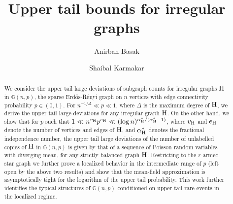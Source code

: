 \documentclass[a4paper,11pt,english,reqno]{amsart}
\numberwithin{equation}{section}
\newcommand{\uH}{\textup{H}}
\newcommand{\G}{\mathbb{G}}
\begin{document}
 
	\title{Upper tail bounds for irregular graphs}
	
	
	
	
	\author{Anirban Basak}
	\address{Anirban Basak, International Centre for Theoretical Sciences, Tata Institute of Fundamental Research, Bangalore, India}
	\author{Shaibal Karmakar}
	\address{Shaibal Karmakar, International Centre for Theoretical Sciences, Tata Institute of Fundamental Research, Bangalore, India}
	
	
	
	
	
	
	
	
	\maketitle
	\begin{abstract}
		We consider the upper tail large deviations of subgraph counts for irregular graphs $\uH$ in $\mathbb{G}(n,p)$, the sparse Erd\H{o}s-R\'enyi graph on $n$ vertices with edge connectivity probability $p \in (0,1)$. For $n^{-1/\Delta} \ll p \ll 1$, where $\Delta$ is the maximum degree of $\uH$, we derive the upper tail large deviations for any irregular graph $\uH$. On the other hand, we show that for $p$ such that $1 \ll n^{v_\uH} p^{e_\uH} \ll (\log n)^{\alpha^{*}_{\uH}/\left(\alpha^{*}_{\uH}-1\right)}$, where $v_\uH$ and $e_\uH$ denote the number of vertices and edges of $\uH$, and $\alpha^*_\uH$ denotes the fractional independence number, the upper tail large deviations of the number of unlabelled copies of $\uH$ in $\G(n,p)$ is given by that of a sequence of Poisson random variables with diverging mean, for any strictly balanced graph $\uH$. Restricting to the $r$-armed star graph we further prove a localized behavior in the intermediate range of $p$ (left open by the above two results) and show that the mean-field approximation is asymptotically tight for the logarithm of the upper tail probability. This work further identifies the typical structures of $\mathbb{G}(n,p)$ conditioned on upper tail rare events in the localized regime.
	\end{abstract}
	
	
\end{document}
